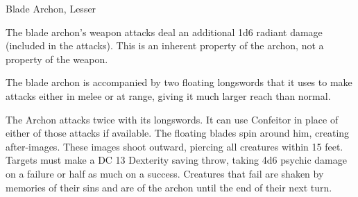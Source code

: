 \begin{DndMonster}{Blade Archon, Lesser}
	\DndMonsterBasics[armor-class={15 (scale mail)}, hit-points={60}, speed={30 ft., fly 50 ft. (hover)}]
	\DndMonsterDetails[skills={Athletics +6}, damage-resistances={radiant}, damage-immunities={poison}, senses={darkvision 60 ft., passive Perception 19}, languages={celestial}, challenge={3:3}]

	 The blade archon's weapon attacks deal an additional 1d6 radiant damage (included in the attacks). This is an inherent property of the archon, not a property of the weapon.
	
	 The blade archon is accompanied by two floating longswords that it uses to make attacks either in melee or at range, giving it much larger reach than normal.
	
	 The Archon attacks twice with its longswords. It can use Confeitor in place of either of those attacks if available.
	\DndMonsterAttack[
		name=Floating Longsword,
		distance=both,
		type=weapon,
		mod=+6,
		reach=20 ft.,
		dmg=\DndDice{1d10+4},
		dmg-type=slashing,
		plus-dmg=\DndDice{1d6},
		plus-dmg-type=radiant
	]
	 The floating blades spin around him, creating after-images. These images shoot outward, piercing all creatures within 15 feet. Targets must make a DC 13 Dexterity saving throw, taking 4d6 psychic damage on a failure or half as much on a success. Creatures that fail are shaken by memories of their sins and are  of the archon until the end of their next turn.
\end{DndMonster}


